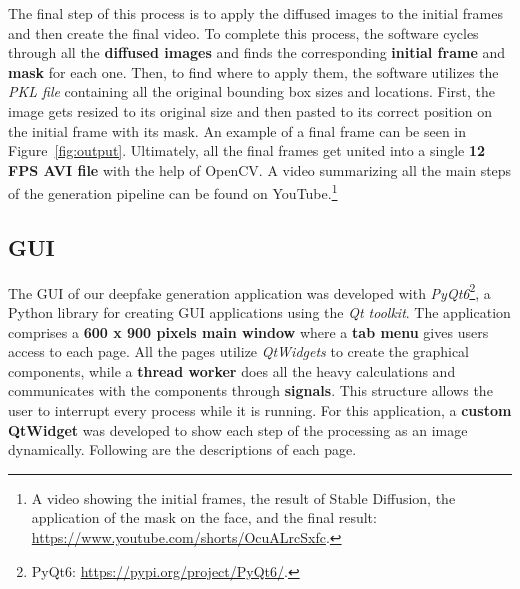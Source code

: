 \documentclass[preprint]{elsarticle}
\begin{document}
The final step of this process is to apply the diffused images to the initial frames and then create the final video. 
To complete this process, the software cycles through all the \textbf{diffused images}  and finds the corresponding \textbf{initial frame} and \textbf{mask} for each one. 
Then, to find where to apply them, the software utilizes the \emph{PKL file} containing all the original bounding box sizes and locations.  First, the image gets resized to its original size and then pasted  to its correct position on the initial frame with its mask. 
An example of a final frame can be seen in Figure~\ref{fig:output}.
Ultimately, all the final frames get united into a single \textbf{12 FPS AVI file} with the help of OpenCV. A video summarizing all the main steps of the generation pipeline can be found on YouTube.\footnote{A video showing the initial frames, the result of Stable Diffusion, the application of the mask on the face, and the final result: \url{https://www.youtube.com/shorts/OcuALrcSxfc}.}



\subsection{GUI}\label{sec:gui}

The GUI of our deepfake generation application was developed with \emph{PyQt6}\footnote{PyQt6: \url{https://pypi.org/project/PyQt6/}.}, 
a Python library for creating GUI applications using the \emph{Qt toolkit}.  The application comprises a \textbf{600 x 900 pixels main window} where a \textbf{tab menu} gives users access to each page.
All the pages utilize \emph{QtWidgets} to create the graphical components,  while a \textbf{thread worker} does all the heavy calculations and communicates  with the components through \textbf{signals}. 
This structure allows the user to interrupt every process while it is running.
For this application, a \textbf{custom QtWidget} was developed to show each step of the processing as an image dynamically. Following are the descriptions of each page.
\end{document}
